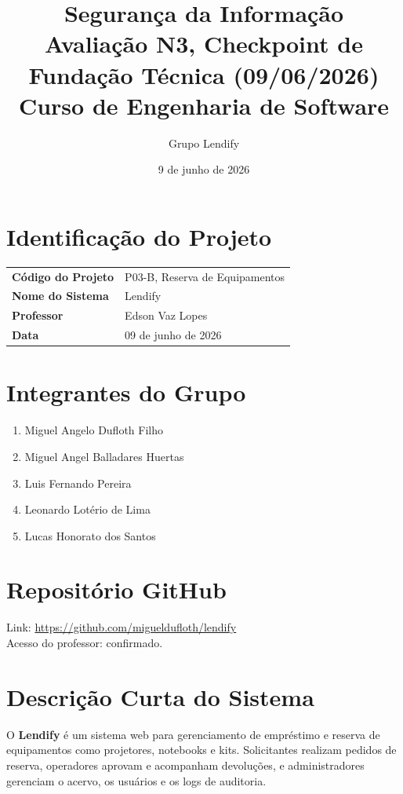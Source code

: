 \documentclass[12pt,a4paper]{article}
\title{
    \textbf{Segurança da Informação} \\
    \large Avaliação N3, Checkpoint de Fundação Técnica (09/06/2026) \\
    \normalsize Curso de Engenharia de Software
}
\author{Grupo Lendify}
\date{9 de junho de 2026}
\begin{document}
\maketitle

\section*{Identificação do Projeto}

\begin{tabular}{@{}ll@{}}
\toprule
\textbf{Código do Projeto} & P03-B, Reserva de Equipamentos \\
\textbf{Nome do Sistema}   & Lendify \\
\textbf{Professor}         & Edson Vaz Lopes \\
\textbf{Data}              & 09 de junho de 2026 \\
\bottomrule
\end{tabular}

\section*{Integrantes do Grupo}

\begin{enumerate}
    \item Miguel Angelo Dufloth Filho
    \item Miguel Angel Balladares Huertas
    \item Luis Fernando Pereira
    \item Leonardo Lotério de Lima
    \item Lucas Honorato dos Santos
\end{enumerate}

\section*{Repositório GitHub}

Link: \url{https://github.com/migueldufloth/lendify} \\
Acesso do professor: confirmado.

\section*{Descrição Curta do Sistema}

O \textbf{Lendify} é um sistema web para gerenciamento de empréstimo e reserva de
equipamentos como projetores, notebooks e kits. Solicitantes realizam pedidos de
reserva, operadores aprovam e acompanham devoluções, e administradores gerenciam
o acervo, os usuários e os logs de auditoria.
\end{document}
